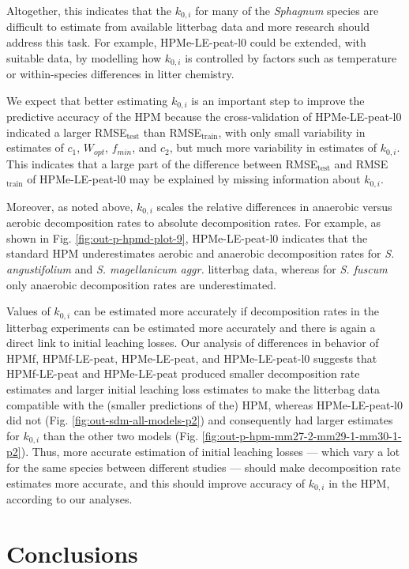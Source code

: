 \documentclass[esd, manuscript]{copernicus}
\begin{document}
Altogether, this indicates that the \(k_{0,i}\) for many of the \emph{Sphagnum} species are difficult to estimate from available litterbag data and more research should address this task. For example, HPMe-LE-peat-l0 could be extended, with suitable data, by modelling how \(k_{0,i}\) is controlled by factors such as temperature or within-species differences in litter chemistry.

We expect that better estimating \(k_{0,i}\) is an important step to improve the predictive accuracy of the HPM because the cross-validation of HPMe-LE-peat-l0 indicated a larger RMSE\(_\text{test}\) than RMSE\(_\text{train}\), with only small variability in estimates of \(c_1\), \(W_{opt}\), \(f_{min}\), and \(c_2\), but much more variability in estimates of \(k_{0,i}\). This indicates that a large part of the difference between RMSE\(_\text{test}\) and RMSE\(_\text{train}\) of HPMe-LE-peat-l0 may be explained by missing information about \(k_{0,i}\).

Moreover, as noted above, \(k_{0,i}\) scales the relative differences in anaerobic versus aerobic decomposition rates to absolute decomposition rates. For example, as shown in Fig. \ref{fig:out-p-hpmd-plot-9}, HPMe-LE-peat-l0 indicates that the standard HPM underestimates aerobic and anaerobic decomposition rates for \emph{S. angustifolium} and \emph{S. magellanicum aggr.} litterbag data, whereas for \emph{S. fuscum} only anaerobic decomposition rates are underestimated.

Values of \(k_{0,i}\) can be estimated more accurately if decomposition rates in the litterbag experiments can be estimated more accurately and there is again a direct link to initial leaching losses. Our analysis of differences in behavior of HPMf, HPMf-LE-peat, HPMe-LE-peat, and HPMe-LE-peat-l0 suggests that HPMf-LE-peat and HPMe-LE-peat produced smaller decomposition rate estimates and larger initial leaching loss estimates to make the litterbag data compatible with the (smaller predictions of the) HPM, whereas HPMe-LE-peat-l0 did not (Fig. \ref{fig:out-sdm-all-models-p2}) and consequently had larger estimates for \(k_{0,i}\) than the other two models (Fig. \ref{fig:out-p-hpm-mm27-2-mm29-1-mm30-1-p2}). Thus, more accurate estimation of initial leaching losses --- which vary a lot for the same species between different studies \citep{Teickner.2024f} --- should make decomposition rate estimates more accurate, and this should improve accuracy of \(k_{0,i}\) in the HPM, according to our analyses.

\section{Conclusions}
\end{document}
